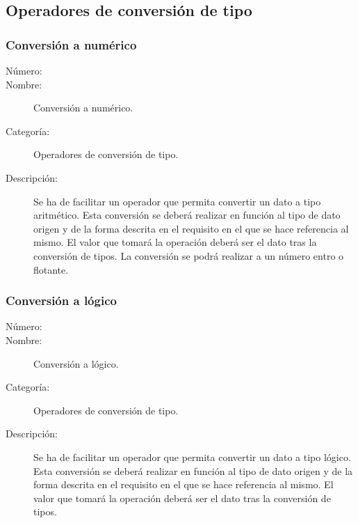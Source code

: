 \subsection{Operadores de conversión de tipo}
\subsubsection{Conversión a numérico}
\begin{framed}
	\begin{description}
		\item [Número:] \cn
		\item [Nombre:] Conversión a numérico.
		\item [Categoría:] Operadores de conversión de tipo.
		\item [Descripción:] Se ha de facilitar un operador que permita convertir un dato a tipo aritmético. Esta conversión
		se deberá realizar en función al tipo de dato origen y de la forma descrita en el requisito en el que se hace referencia al mismo.
		El valor que tomará la operación deberá ser el dato tras la conversión de tipos. La conversión se podrá realizar a un número
      entro o flotante.
	\end {description}
\end{framed}

\subsubsection{Conversión a lógico}
\begin{framed}
	\begin{description}
		\item [Número:] \cn
		\item [Nombre:] Conversión a lógico.
		\item [Categoría:] Operadores de conversión de tipo.
		\item [Descripción:] Se ha de facilitar un operador que permita convertir un dato a tipo lógico. Esta conversión
		se deberá realizar en función al tipo de dato origen y de la forma descrita en el requisito en el que se hace referencia al mismo.
		El valor que tomará la operación deberá ser el dato tras la conversión de tipos.
	\end {description}
\end{framed}

